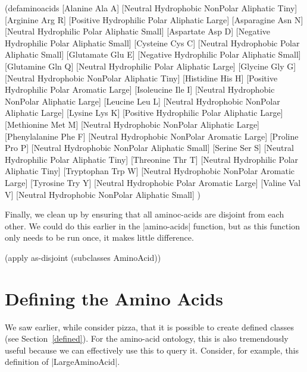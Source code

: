 \begin{tawny}
(defaminoacids
  [Alanine       Ala A] [Neutral  Hydrophobic NonPolar Aliphatic Tiny]
  [Arginine      Arg R] [Positive Hydrophilic Polar    Aliphatic Large]
  [Asparagine    Asn N] [Neutral  Hydrophilic Polar    Aliphatic Small]
  [Aspartate     Asp D] [Negative Hydrophilic Polar    Aliphatic Small]
  [Cysteine      Cys C] [Neutral  Hydrophobic Polar    Aliphatic Small]
  [Glutamate     Glu E] [Negative Hydrophilic Polar    Aliphatic Small]
  [Glutamine     Gln Q] [Neutral  Hydrophilic Polar    Aliphatic Large]
  [Glycine       Gly G] [Neutral  Hydrophobic NonPolar Aliphatic Tiny]
  [Histidine     His H] [Positive Hydrophilic Polar    Aromatic  Large]
  [Isoleucine    Ile I] [Neutral  Hydrophobic NonPolar Aliphatic Large]
  [Leucine       Leu L] [Neutral  Hydrophobic NonPolar Aliphatic Large]
  [Lysine        Lys K] [Positive Hydrophilic Polar    Aliphatic Large]
  [Methionine    Met M] [Neutral  Hydrophobic NonPolar Aliphatic Large]
  [Phenylalanine Phe F] [Neutral  Hydrophobic NonPolar Aromatic  Large]
  [Proline       Pro P] [Neutral  Hydrophobic NonPolar Aliphatic Small]
  [Serine        Ser S] [Neutral  Hydrophilic Polar    Aliphatic Tiny]
  [Threonine     Thr T] [Neutral  Hydrophilic Polar    Aliphatic Tiny]
  [Tryptophan    Trp W] [Neutral  Hydrophobic NonPolar Aromatic  Large]
  [Tyrosine      Try Y] [Neutral  Hydrophobic Polar    Aromatic  Large]
  [Valine        Val V] [Neutral  Hydrophobic NonPolar Aliphatic Small]
  )
\end{tawny}

Finally, we clean up by ensuring that all aminoc-acids are disjoint from each
other. We could do this earlier in the |amino-acids| function, but as this
function only needs to be run once, it makes little difference.

\begin{tawny}
(apply as-disjoint (subclasses AminoAcid))
\end{tawny}

\section{Defining the Amino Acids}
\label{sec:defining-amino-acids}

We saw earlier, while consider pizza, that it is possible to create
defined classes (see Section~\ref{defined}). For the amino-acid
ontology, this is also tremendously useful because we can effectively
use this to query it. Consider, for example, this definition of
|LargeAminoAcid|.

